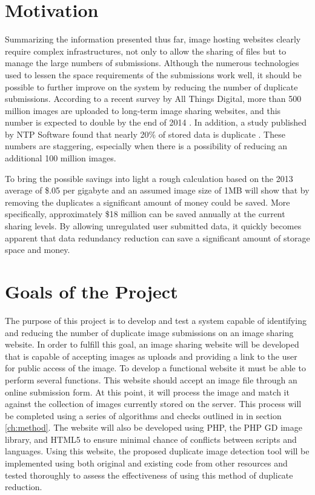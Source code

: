 \section{Motivation} \label{sec:motivation}
Summarizing the information presented thus far, image hosting websites clearly require complex infrastructures, not only to allow the sharing of files but to manage the large numbers of submissions. Although the numerous technologies used to lessen the space requirements of the submissions work well, it should be possible to further improve on the system by reducing the number of duplicate submissions. According to a recent survey by All Things Digital, more than 500 million images are uploaded to long-term image sharing websites, and this number is expected to double by the end of 2014 \cite{meek:500}. In addition, a study published by NTP Software found that nearly 20\% of stored data is duplicate \cite{ntps:staledata}. These numbers are staggering, especially when there is a possibility of reducing an additional 100 million images.

To bring the possible savings into light a rough calculation based on the 2013 average of \$.05 per gigabyte and an assumed image size of 1MB will show that by removing the duplicates a significant amount of money could be saved. More specifically, approximately \$18 million can be saved annually at the current sharing levels. By allowing unregulated user submitted data, it quickly becomes apparent that data redundancy reduction can save a significant amount of storage space and money.

\section{Goals of the Project}\label{sec:goals}
The purpose of this project is to develop and test a system capable of identifying and reducing the number of duplicate image submissions on an image sharing website. In order to fulfill this goal, an image sharing website will be developed that is capable of accepting images as uploads and providing a link to the user for public access of the image. To develop a functional website it must be able to perform several functions. This website should accept an image file through an online submission form. At this point, it will process the image and match it against the collection of images currently stored on the server. This process will be completed using a series of algorithms and checks outlined in in section \ref{ch:method}. The website will also be developed using PHP, the PHP GD image library, and HTML5 to ensure minimal chance of conflicts between scripts and languages. Using this website, the proposed duplicate image detection tool will be implemented using both original and existing code from other resources and tested thoroughly to assess the effectiveness of using this method of duplicate reduction.

